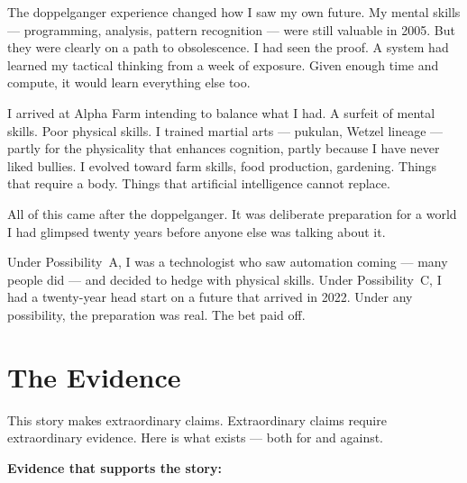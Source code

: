 The doppelganger experience changed how I saw my own future. My mental skills --- programming, analysis, pattern recognition --- were still valuable in 2005. But they were clearly on a path to obsolescence. I had seen the proof. A system had learned my tactical thinking from a week of exposure. Given enough time and compute, it would learn everything else too.

I arrived at Alpha Farm intending to balance what I had. A surfeit of mental skills. Poor physical skills. I trained martial arts --- pukulan, Wetzel lineage --- partly for the physicality that enhances cognition, partly because I have never liked bullies. I evolved toward farm skills, food production, gardening. Things that require a body. Things that artificial intelligence cannot replace.

All of this came after the doppelganger. It was deliberate preparation for a world I had glimpsed twenty years before anyone else was talking about it.

Under Possibility~A, I was a technologist who saw automation coming --- many people did --- and decided to hedge with physical skills. Under Possibility~C, I had a twenty-year head start on a future that arrived in 2022. Under any possibility, the preparation was real. The bet paid off.


\section*{The Evidence}
\label{pos35:the-evidence}

This story makes extraordinary claims. Extraordinary claims require extraordinary evidence. Here is what exists --- both for and against.

\vspace{0.3cm}

\textbf{Evidence that supports the story:}

